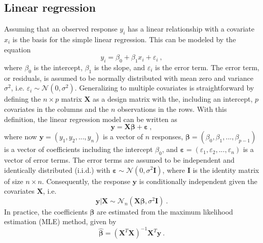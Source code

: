 \subsection{Linear regression}
Assuming that an observed response $y_i$ has a linear relationship with a covariate $x_i$ is the basis for the simple linear regression.
This can be modeled by the equation
\begin{equation}
    y_i = \beta_0 + \beta_1x_i + \varepsilon_i \ ,
\end{equation}
where $\beta_0$ is the intercept, $\beta_1$ is the slope, and $\varepsilon_i$ is the error term.
The error term, or residuals, is assumed to be normally distributed with mean zero and variance $\sigma^2$, i.e. $\varepsilon_i \sim \mathcal{N}(0, \sigma^2)$.
Generalizing to multiple covariates is straightforward by defining the $n\times p$ matrix $\mathbf{X}$ as a design matrix with the, including an intercept, $p$ covariates in the columns and the $n$ observations in the rows.
With this definition, the linear regression model can be written as
\begin{equation}
    \label{eq:linreg}
    \mathbf{y} = \mathbf{X}\boldsymbol{\beta} + \mathbf{\varepsilon} \ ,
\end{equation}
where now $\mathbf{y}=(y_1, y_2, ..., y_n)$ is a vector of $n$ responses, $\boldsymbol{\beta}=(\beta_0, \beta_1, ..., \beta_{p-1})$ is a vector of coefficients including the intercept $\beta_0$, and $\mathbf{\varepsilon}=(\varepsilon_1, \varepsilon_2, ..., \varepsilon_n)$ is a vector of error terms.
The error terms are assumed to be independent and identically distributed (i.i.d.) with $\boldsymbol{\varepsilon} \sim \mathcal{N}(0, \sigma^2 \mathbf{I})$, where $\mathbf{I}$ is the identity matrix of size $n \times n$.
Consequently, the response $\mathbf{y}$ is conditionally independent given the covariates $\mathbf{X}$, i.e.
\begin{equation}
    \mathbf{y} \lvert \mathbf{X} \sim \mathcal{N}_n(\mathbf{X}\boldsymbol{\beta}, \sigma^2\mathbf{I}) \ .
\end{equation}
In practice, the coefficients $\boldsymbol{\beta}$ are estimated from the maximum likelihood estimation (MLE) method, given by
\begin{equation}
    \label{eq:beta_hat}
    \hat{\boldsymbol{\beta}} = (\mathbf{X}^T\mathbf{X})^{-1}\mathbf{X}^T\mathbf{y} \ .
\end{equation}

